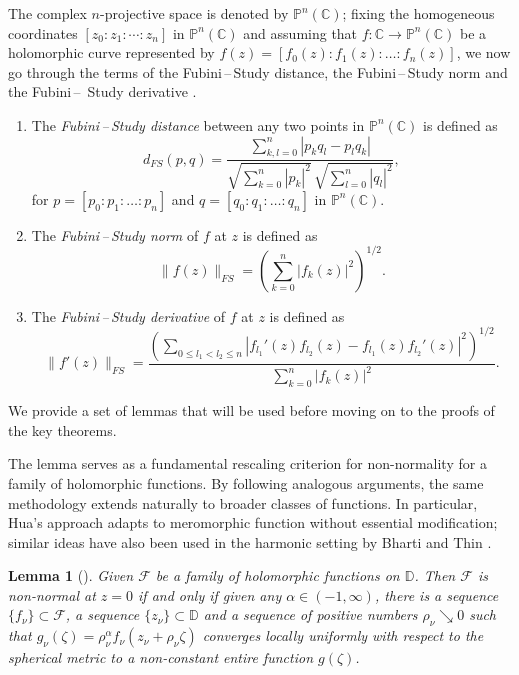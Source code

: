 \documentclass[11pt, reqno]{amsart}
\newtheorem{lemma}[theorem]{Lemma}
\theoremstyle{definition}
\theoremstyle{remark}
\numberwithin{equation}{section}
\begin{document}
The complex $n$-projective space is denoted by  $\mathbb{P}^n(\mathbb{C})$; fixing the homogeneous coordinates
$[z_0:z_1:\cdots:z_n]$ in $\mathbb P^n(\mathbb C)$ and assuming that $f : \mathbb{C} \to \mathbb{P}^n(\mathbb{C})$ be a holomorphic curve represented by 
$f(z) = [f_0(z) : f_1(z) : \dots : f_n(z)]$, we now go through the terms of the Fubini\,–\,Study distance, the Fubini\,–\,Study norm and the Fubini\,–
\,Study derivative \cite{eremenko-nhcfprtps-2007, quang-wnaqfohc-2018}.

\begin{enumerate}
    \item The \emph{Fubini\,--\,Study distance} between any two points in $\mathbb P^n(\mathbb C)$ is defined as
\begin{equation*}
d_{FS}(p,q) = \frac{\sum_{k,l=0}^n |p_k q_l - p_l q_k|}{\sqrt{\sum_{k=0}^n |p_k|^2} \, \sqrt{\sum_{l=0}^n |q_l|^2}},
\end{equation*}
for $p = [p_0 : p_1 : \dots : p_n]$ and $q = [q_0 : q_1 : \dots : q_n]$ in $\mathbb{P}^n(\mathbb{C})$. \smallskip
    \item The \emph{Fubini\,--\,Study norm} of $f$ at $z$ is defined as \begin{equation*}
\|f(z)\|_{FS} = \left( \sum_{k=0}^n |f_k(z)|^2 \right)^{1/2}.
\end{equation*}
    \item The \emph{Fubini\,--\,Study derivative} of $f$ at $z$ is defined as \begin{equation*}
\|f'(z)\|_{FS} = 
\frac{\left( \sum_{0 \le l_1 < l_2 \le n} 
\left| f_{l_1}'(z) f_{l_2}(z) - f_{l_1}(z) f_{l_2}'(z) \right|^2 \right)^{1/2}}
{\sum_{k=0}^n |f_k(z)|^2}.
\end{equation*}
\end{enumerate}

We provide a set of lemmas that will be used before moving on to the proofs of the key theorems. \smallskip

The lemma serves as a fundamental rescaling criterion for non-normality for a family of holomorphic 
functions. By following analogous arguments, the same methodology extends naturally to broader classes of functions. In particular, Hua’s \cite{hua-anatnc-1995} approach adapts to meromorphic function without 
essential modification; similar ideas have also been used in the harmonic setting by Bharti and Thin \cite{bharti-ronhapnhm-2025}.\smallskip
\begin{lemma}[{\cite[Lemma 6]{hua-anatnc-1995}}] \label{L-Hua} 
Given $\mathcal{F}$ be a family of holomorphic functions on $\mathbb D$. Then $\mathcal F$ is non-normal at $z=0$ if and only if given any 
$\alpha\in(-1,\infty)$, there is a sequence $\{f_{\nu}\}\subset\mathcal F$, a sequence $\{z_{\nu}\}\subset \mathbb D$ and a sequence of 
positive numbers $\rho_{\nu} \searrow 0$ such that $g_{\nu}(\zeta)=\rho_{\nu} ^{\alpha}f_{\nu}(z_{\nu}+\rho_{\nu} \zeta)$ converges locally 
uniformly with respect to the spherical metric to a non-constant entire function $g(\zeta)$.
\end{lemma}
\end{document}
